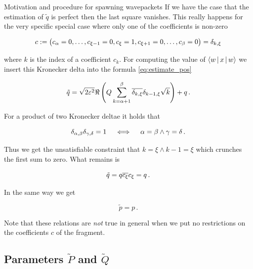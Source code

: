 \begin{chapter}{Motivation and procedure for spawning wavepackets}
If we have the case that the estimation of $\tilde{q}$ is perfect then the last
square vanishes. This really happens for the very specific special case where only
one of the coefficients is non-zero

\begin{equation*}
  c := \begin{pmatrix}
              c_\alpha = 0, \ldots, c_{\xi-1}=0, c_\xi=1, c_{\xi+1}=0, \ldots, c_{\beta} = 0
            \end{pmatrix}
    = \delta_{k, \xi}
\end{equation*}

where $k$ is the index of a coefficient $c_k$. For computing the value of
$\Braket{w | x | w}$ we insert this Kronecker delta into the formula \eqref{eq:estimate_pos}

\begin{equation*}
\begin{split}
  \tilde{q} = \sqrt{2 \varepsilon^2} \Re \left(Q \sum_{k=\alpha+1}^\beta \overline{\delta_{k,\xi}} \delta_{k-1,\xi} \sqrt{k} \right) + q \,.
\end{split}
\end{equation*}

For a product of two Kronecker deltae it holds that

\begin{equation*}
  \delta_{\alpha,\beta} \delta_{\gamma,\delta} = 1 \quad \iff \quad \alpha = \beta \wedge \gamma = \delta \,.
\end{equation*}

Thus we get the unsatisfiable constraint that $k = \xi \wedge k-1 = \xi$ which
crunches the first sum to zero. What remains is

\begin{equation*}
  \tilde{q} = q \overline{c_\xi}c_\xi = q \,.
\end{equation*}

In the same way we get

\begin{equation*}
  \tilde{p} = p \,.
\end{equation*}

Note that these relations are \emph{not} true in general when we put no restrictions
on the coefficients $c$ of the fragment.


\subsection{Parameters $\tilde{P}$ and $\tilde{Q}$}
\label{sec:pq}


\end{chapter}
